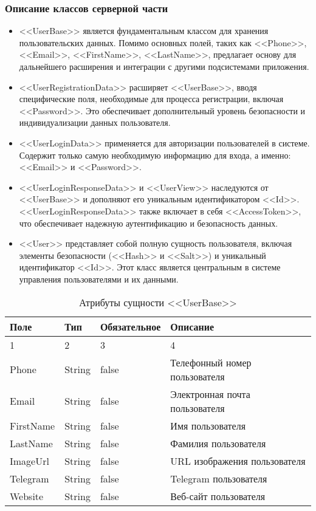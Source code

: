 \subsubsection{Описание классов серверной части}

\begin{itemize}
    \item <<UserBase>> является фундаментальным классом для хранения пользовательских данных. Помимо основных полей, таких как <<Phone>>, <<Email>>, <<FirstName>>, <<LastName>>, предлагает основу для дальнейшего расширения и интеграции с другими подсистемами приложения.
    \item <<UserRegistrationData>> расширяет <<UserBase>>, вводя специфические поля, необходимые для процесса регистрации, включая <<Password>>. Это обеспечивает дополнительный уровень безопасности и индивидуализации данных пользователя.
    \item <<UserLoginData>> применяется для авторизации пользователей в системе. Содержит только самую необходимую информацию для входа, а именно: <<Email>> и <<Password>>.
    \item <<UserLoginResponseData>> и <<UserView>> наследуются от <<UserBase>> и дополняют его уникальным идентификатором <<Id>>. <<UserLoginResponseData>> также включает в себя <<AccessToken>>, что обеспечивает надежную аутентификацию и безопасность данных.
    \item <<User>> представляет собой полную сущность пользователя, включая элементы безопасности (<<Hash>> и <<Salt>>) и уникальный идентификатор <<Id>>. Этот класс является центральным в системе управления пользователями и их данными.
\end{itemize}

\begin{xltabular}{\textwidth}{|l|l|p{1.7cm}|X|}
    \caption{Атрибуты сущности <<UserBase>>}\\ \hline
    Поле & Тип & Обяза\-тельное & Описание \\  & 2 & 3 & 4 \\ \hline
    Phone & String & false & Телефонный номер пользователя \\ \hline
    Email & String & false & Электронная почта пользователя \\ \hline
    FirstName & String & false & Имя пользователя \\ \hline
    LastName & String & false & Фамилия пользователя \\ \hline
    ImageUrl & String & false & URL изображения пользователя \\ \hline
    Telegram & String & false & Telegram пользователя \\ \hline
    Website & String & false & Веб-сайт пользователя \\ \hline
\end{xltabular}



